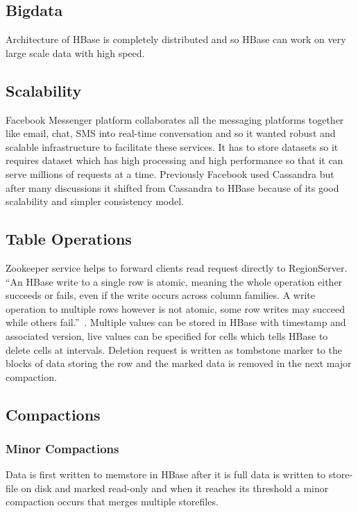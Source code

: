 \subsection{Bigdata}

Architecture of HBase is completely distributed and so HBase can work on very 
large scale data with high speed. 

\subsection{Scalability} 

Facebook Messenger platform collaborates all the messaging platforms together 
like email, chat, SMS into real-time conversation and so it wanted robust and 
scalable infrastructure to facilitate these services. It has to store 
datasets so it requires dataset which has high processing and high performance
so that it can serve millions of requests at a time. Previously Facebook used 
Cassandra but after many discussions it shifted from Cassandra to HBase because
of its good scalability and simpler consistency model. 


\subsection{Table Operations} 

Zookeeper service helps to forward clients read request directly to RegionServer.
``An HBase write to a single row is atomic, meaning the whole operation either 
succeeds or fails, even if the write occurs across column families. A write 
operation to multiple rows however is not atomic, some row writes may succeed 
while others fail.''~\cite{hid-sp18-421-HBase-tableoper}. Multiple values can be
stored in HBase with timestamp and associated version, live values can be 
specified for cells which tells HBase to delete cells at intervals. Deletion 
request is written as tombstone marker to the blocks of data storing the row and 
the marked data is removed in the next major compaction.

\subsection{Compactions} 

\subsubsection{Minor Compactions}

Data is first written to memstore in HBase after it is full data is written to 
store-file on disk and marked read-only and when it reaches its threshold a minor
compaction occurs that merges multiple storefiles.

